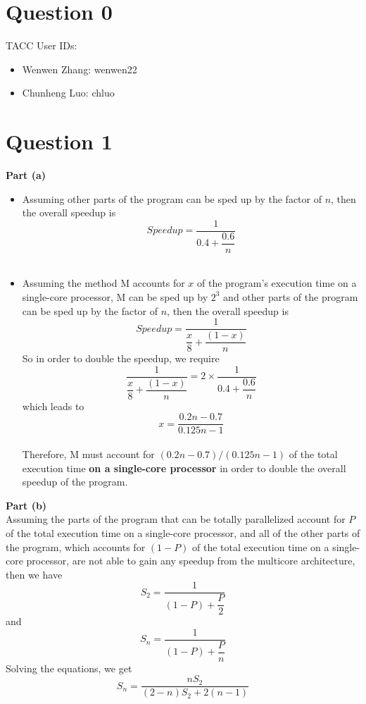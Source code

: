 \documentclass[12pt]{article}
\begin{document}
\maketitle

\section*{Question 0} 
TACC User IDs:
\begin{itemize}
\vspace{-1ex}
\item Wenwen Zhang: wenwen22  \\
\vspace{-1ex}
\item Chunheng Luo: chluo     \\
\vspace{-1ex}
\end{itemize}

\section*{Question 1}

\textbf{Part (a)}

\begin{itemize} 
\item Assuming other parts of the program can be sped up by the factor of $n$, then the overall speedup is $$Speedup = \dfrac{1}{0.4+\dfrac{0.6}{n}}$$  \\
\item Assuming the method M accounts for $x$ of the program's execution time on a single-core processor, M can be sped up by $2^3$ and other parts of the program can be sped up by the factor of $n$, then the overall speedup is $$Speedup = \dfrac{1}{\dfrac{x}{8} + \dfrac{(1-x)}{n}}$$
So in order to double the speedup, we require $$\dfrac{1}{ \dfrac{x}{8} + \dfrac{(1-x)}{n}} = 2\times\dfrac{1}{0.4+\dfrac{0.6}{n}}$$ 
which leads to $$x = \dfrac{0.2n - 0.7}{0.125n - 1}$$ \\
Therefore, M must account for $(0.2n - 0.7)/(0.125n - 1)$ of the total execution time \textbf{on a single-core processor} in order to double the overall speedup of the program. 
\end{itemize}

\textbf{Part (b)} \\ 

Assuming the parts of the program that can be totally parallelized account for $P$ of the total execution time on a single-core processor, and all of the other parts of the program, which accounts for $(1-P)$ of the total execution time on a single-core processor, are not able to gain any speedup from the multicore architecture, then we have 
$$S_2 = \dfrac{1}{(1-P) + \dfrac{P}{2}}$$ and $$S_n = \dfrac{1}{(1-P) + \dfrac{P}{n}}$$
Solving the equations, we get $$S_n = \dfrac{nS_2}{(2-n)S_2 + 2(n-1)}$$ 
\end{document}
